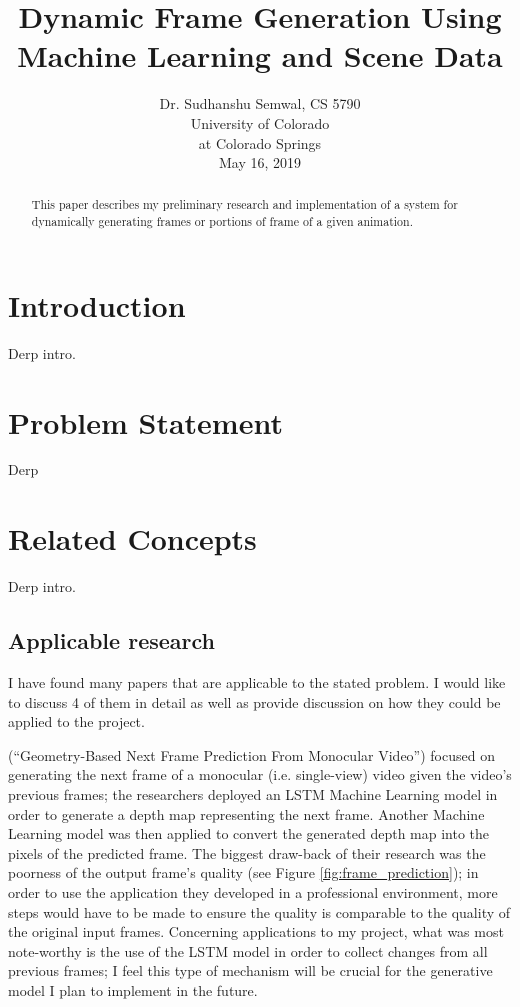 \documentclass[conference]{IEEEtran}
\begin{document}
\title{Dynamic Frame Generation Using Machine Learning
and Scene Data
}

\author{
Dr. Sudhanshu Semwal, CS 5790\\
University of Colorado\\
at Colorado Springs\\
May 16, 2019}

\maketitle

\begin{abstract}
This paper describes my preliminary research and implementation of a
system for dynamically generating frames or portions of frame
of a given animation.
\end{abstract}

\section{Introduction}
\label{sec:introduction}
Derp intro.

\section{Problem Statement}
\label{sec:}
Derp

\section{Related Concepts}
\label{sec:related concepts}
Derp intro.

\subsection{Applicable research}
\label{subsec:applicable}
I have found many papers that are applicable to the stated problem. I would like
to discuss 4 of them in detail as well as provide
discussion on how they could be applied to the project.

\cite{ref:frame_prediction} (``Geometry-Based Next Frame Prediction From
Monocular Video'') focused on generating the
next frame of a monocular (i.e. single-view) video 
given the video's previous frames; the researchers deployed
an LSTM Machine Learning model in order to generate a depth map representing the next frame.
Another Machine Learning model was then applied to convert the generated depth
map into the pixels of the predicted frame. The biggest draw-back of their
research was the poorness of the output frame's quality (see Figure
\ref{fig:frame_prediction}); in order to use the
application they developed in a professional environment, more steps would have
to be made to ensure the quality is comparable to the quality of the original input frames.
Concerning applications to my
project, what was most note-worthy is the use of the LSTM model in order to
collect changes from all previous frames; I feel this type of mechanism will be
crucial for the generative model I plan to implement in the future.
\end{document}
